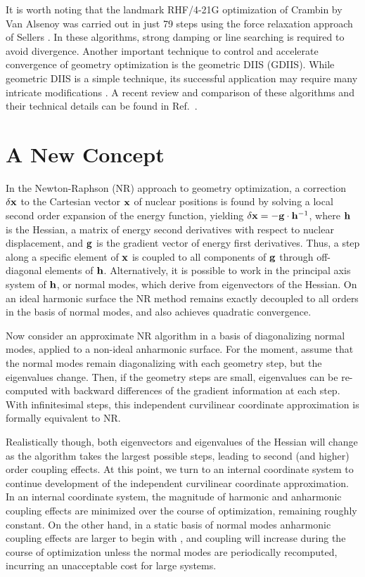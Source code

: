 \documentclass[prl,aps,preprint,showpacs,superbib]{revtex4}
\begin{document}
It is worth noting that the landmark RHF/4-21G optimization of Crambin by Van Alsenoy \cite{van_alsenoy_98}
was carried out in just 79 steps using the force relaxation approach of Sellers \cite{sellers}.
In these algorithms, strong damping \cite{sellers} or line searching \cite{sclegel_linesearch}
is required to avoid divergence. Another important technique to control and accelerate convergence of 
geometry optimization is the geometric DIIS \cite{Pulay_GDIIS} (GDIIS). While geometric DIIS is a simple 
technique, its successful application may require many intricate modifications \cite{Farkas_GDIIS}.  A 
recent review and comparison of these algorithms and their technical details can be found in 
Ref.~\cite{bakken}.  

\section{A New Concept} \label{concept}

In the Newton-Raphson (NR) approach to geometry optimization, a correction $\delta {\bf x}$  to the 
Cartesian vector $\bf x$ of nuclear positions is found by solving a local second order expansion of the 
energy function, yielding  $\delta {\bf x}  = - {\bf g}\cdot {\bf h}^{-1}$,  where $\bf h$ 
is the Hessian, a matrix of energy second derivatives with respect to nuclear displacement,
and $\bf g$ is the gradient vector of energy first derivatives.  Thus, 
a step along a specific element of $\bf x$ is coupled to all components of $\bf g$ through off-diagonal 
elements of $\bf h$.  Alternatively, it is possible to work in the principal axis system of $\bf h$, or 
normal modes,  which derive from eigenvectors of the Hessian.  On an ideal harmonic surface the NR method 
remains exactly decoupled to all orders in the basis of normal modes, and also achieves quadratic convergence.  

Now consider an approximate NR algorithm in a basis of diagonalizing normal modes,  applied to a 
non-ideal anharmonic surface.  For the moment,  assume that the normal modes remain diagonalizing with each
geometry step, but the eigenvalues change.  Then, if the geometry steps are small,
eigenvalues can be re-computed with backward differences of the gradient information at each step. 
With infinitesimal steps, this independent curvilinear coordinate approximation is formally equivalent 
to NR.  

Realistically though, both eigenvectors and eigenvalues of the Hessian will change as the 
algorithm takes the largest possible steps, leading to second (and higher) order coupling effects.  At this point, 
we turn to an internal coordinate system to continue development of the independent curvilinear coordinate 
approximation.  In an internal coordinate system, the magnitude of harmonic and anharmonic coupling
effects are minimized over the course of optimization, remaining roughly constant.  On the other hand,
in a static basis of normal modes anharmonic coupling effects are larger to begin with \cite{fogarasi_diaghess}, 
and coupling will increase during the course of optimization unless the normal modes are 
periodically recomputed, incurring an unacceptable cost for large systems.  
\end{document}
